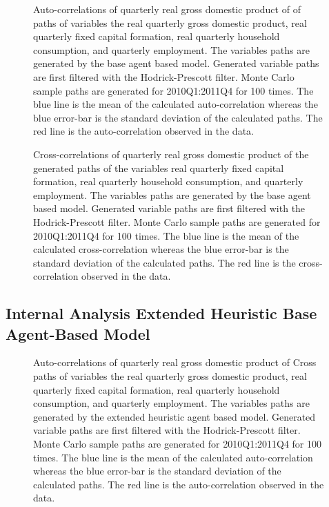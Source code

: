 \begin{figure}[h!]
    \centering
    
		\caption{Auto-correlations of quarterly real gross domestic product of of paths of variables the real quarterly gross domestic product, real quarterly fixed capital formation, real quarterly household consumption, and quarterly employment. The variables paths are generated by the base agent based model. Generated variable paths are first filtered with the Hodrick-Prescott filter. Monte Carlo sample paths are generated for 2010Q1:2011Q4 for 100 times. The blue line is the mean of the calculated auto-correlation whereas the blue error-bar is the standard deviation of the calculated paths. The red line is the auto-correlation observed in the data. }
    \label{fig:autocorr-base-abm}
\end{figure}


\begin{figure}[!h]
    \centering
      
    \caption{Cross-correlations of quarterly real gross domestic product of the generated paths of the variables real quarterly fixed capital formation, real quarterly household consumption, and quarterly employment. The variables paths are generated by the base agent based model. Generated variable paths are first filtered with the Hodrick-Prescott filter. Monte Carlo sample paths are generated for 2010Q1:2011Q4 for 100 times. The blue line is the mean of the calculated cross-correlation whereas the blue error-bar is the standard deviation of the calculated paths. The red line is the cross-correlation observed in the data.}
    \label{fig:crosscorr-base-abm}
\end{figure}

\pagebreak

\subsection{Internal Analysis Extended Heuristic Base Agent-Based Model}
\begin{figure}[!h]
    \centering
    
    \caption{Auto-correlations of quarterly real gross domestic product of Cross paths of variables the real quarterly gross domestic product, real quarterly fixed capital formation, real quarterly household consumption, and quarterly employment. The variables paths are generated by the extended heuristic agent based model. Generated variable paths are first filtered with the Hodrick-Prescott filter. Monte Carlo sample paths are generated for 2010Q1:2011Q4 for 100 times. The blue line is the mean of the calculated auto-correlation whereas the blue error-bar is the standard deviation of the calculated paths. The red line is the auto-correlation observed in the data. }
    \label{fig:crosscorr-eh-abm}
\end{figure}

